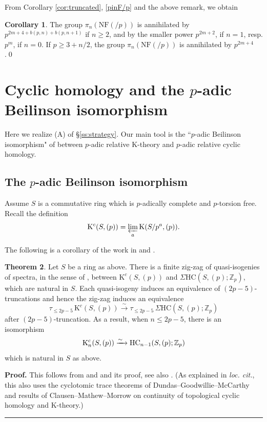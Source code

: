 \documentclass[reqno,11pt,letterpaper]{amsart}
\theoremstyle{plain}
\numberwithin{equation}{subsection}
\newtheorem{theorem}[equation]{Theorem}
\newtheorem{corollary}[equation]{Corollary}
\theoremstyle{remark}
\theoremstyle{plain}
\theoremstyle{definition}\newtheorem*{notation}{Notation}
\newtheorem{theorem}{Theorem}
\newtheorem{corollary}[theorem]{Corollary}
\newenvironment{proof}[1][Proof]{\noindent\textbf{#1.} }{\ \rule{0.5em}{0.5em}}
\newcommand{\RK}{\mathrm{K}}
\newcommand{\RNF}{\mathrm{NF}}
\newcommand{\BZ}{\mathbb{Z}}
\newcommand{\HC}{\mathrm{HC}}
\begin{document}
From Corollary \ref{cor:truncated}, \eqref{pinF/p} and the above remark, we obtain

\begin{corollary}\label{cor:truncated2}
The group $\pi_n(\RNF(/p))$ is annihilated by
$
 p^{2m+4+b(p, n)+b(p, n+1) }  
$
if $n\geq 2$, and by the smaller power $p^{2m+2}$, if $n=1$, resp. $p^m$, if $n=0$.
If $p\geq 3+n/2$, the group $\pi_n(\RNF(/p))$ is annihilated by $p^{2m+4}$.\qed
\end{corollary}
 

\section{Cyclic homology and the $p$-adic Beilinson isomorphism}\label{s:Beilinson}

Here we realize (A) of \S \ref{ss:strategy}. Our main tool is the ``$p$-adic Beilinson isomorphism" of \cite{NikolausBFSq} between $p$-adic relative $\RK$-theory and $p$-adic relative cyclic homology.
  

\subsection{The $p$-adic Beilinson isomorphism}\label{ss:cont}

Assume $S$ is a commutative ring which is $p$-adically complete and $p$-torsion free.
Recall the definition
\[
\RK^c(S, (p))=\varprojlim_a \RK(S/p^a, (p)).
\]


The following is a corollary of the work in  \cite{henselian}  and \cite{NikolausBFSq}. 
 
\begin{theorem}\label{masterprop} 
Let $S$ be a ring as above. There is a finite zig-zag of quasi-isogenies of spectra, in the sense of \cite[\S 2.3]{NikolausBFSq},
between $\RK^c(S, (p))$ and $\Sigma\HC(S, (p);\BZ_p)$, which are natural in $S$. Each quasi-isogeny induces an equivalence of $(2p-5)$-truncations
and hence the zig-zag induces an equivalence
\[
\tau_{\leq 2p-5}\,\RK^c(S, (p))\xrightarrow{\sim} \tau_{\leq 2p-5}\,\Sigma\HC(S, (p);\BZ_p)
\] 
after $(2p-5)$-truncation. As a result, when $n\leq 2p-5$, there is an isomorphism
\[
 \RK^c_n(S, (p))\xrightarrow{ \sim\ }{\rm HC}_{n-1}(S, (p);\BZ_p)
\]
 which is natural in $S$ as above.
\end{theorem}

\begin{proof}
This follows from    \cite[Remark 2.17]{NikolausBFSq} and \cite[Theorem 2.20]{NikolausBFSq} and its proof, see also \cite[Corollary B]{NikolausBFSq}. (As explained in \emph{loc. cit.}, this also uses the cyclotomic trace theorems of Dundas--Goodwillie--McCarthy and results of Clausen--Mathew--Morrow \cite{henselian} on continuity of topological cyclic homology and $\RK$-theory.)  
\end{proof}
\end{document}
